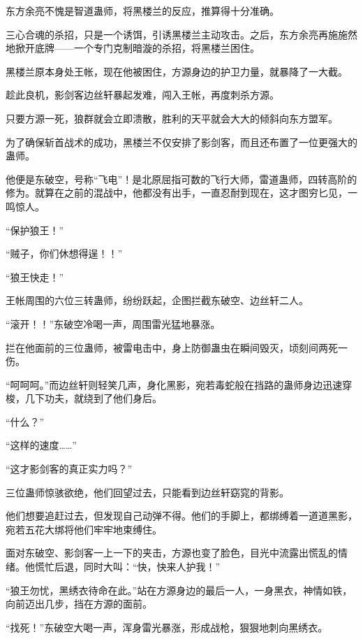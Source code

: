 
\begin{this_body}

东方余亮不愧是智道蛊师，将黑楼兰的反应，推算得十分准确。

三心合魂的杀招，只是一个诱饵，引诱黑楼兰主动攻击。之后，东方余亮再施施然地掀开底牌——一个专门克制暗漩的杀招，将黑楼兰困住。

黑楼兰原本身处王帐，现在他被困住，方源身边的护卫力量，就暴降了一大截。

趁此良机，影剑客边丝轩暴起发难，闯入王帐，再度刺杀方源。

只要方源一死，狼群就会立即溃散，胜利的天平就会大大的倾斜向东方盟军。

为了确保斩首战术的成功，黑楼兰不仅安排了影剑客，而且还布置了一位更强大的蛊师。

他便是东破空，号称“飞电”！是北原屈指可数的飞行大师，雷道蛊师，四转高阶的修为。就算在之前的混战中，他都没有出手，一直忍耐到现在，这才图穷匕见，一鸣惊人。

“保护狼王！”

“贼子，你们休想得逞！！”

“狼王快走！”

王帐周围的六位三转蛊师，纷纷跃起，企图拦截东破空、边丝轩二人。

“滚开！！”东破空冷喝一声，周围雷光猛地暴涨。

拦在他面前的三位蛊师，被雷电击中，身上防御蛊虫在瞬间毁灭，顷刻间两死一伤。

“呵呵呵。”而边丝轩则轻笑几声，身化黑影，宛若毒蛇般在挡路的蛊师身边迅速穿梭，几下功夫，就绕到了他们身后。

“什么？”

“这样的速度……”

“这才影剑客的真正实力吗？”

三位蛊师惊骇欲绝，他们回望过去，只能看到边丝轩窈窕的背影。

他们想要追赶过去，但发现自己动弹不得。他们的手脚上，都绑缚着一道道黑影，宛若五花大绑将他们牢牢地束缚住。

面对东破空、影剑客一上一下的夹击，方源也变了脸色，目光中流露出慌乱的情绪。他慌忙后退，同时大叫：“快，快来人护我！”

“狼王勿忧，黑绣衣待命在此。”站在方源身边的最后一人，一身黑衣，神情如铁，向前迈出几步，挡在方源的面前。

“找死！”东破空大喝一声，浑身雷光暴涨，形成战枪，狠狠地刺向黑绣衣。


\end{this_body}
